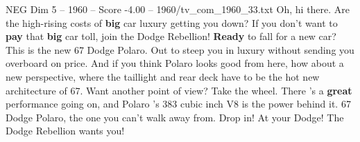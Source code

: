 \begin{textsample}{NEG Dim 5 – 1960 – Score -4.00 – 1960/tv\_com\_1960\_33.txt}  \label{ex:f5_neg_004}
Oh, hi there.
Are the high-rising costs of \textbf{big} car luxury getting you down?
If you don't want to \textbf{pay} that \textbf{big} car toll, join the Dodge Rebellion! \textbf{Ready} to fall for a new car?
This is the new 67 Dodge Polaro.
Out to steep you in luxury without sending you overboard on price.
And if you think Polaro looks good from here, how about a new perspective, where the taillight and rear deck have to be the hot new architecture of 67.
Want another point of view?
Take the wheel.
There 's a \textbf{great} performance going on, and Polaro 's 383 cubic inch V8 is the power behind it. 67 Dodge Polaro, the one you can't walk away from.
Drop in!
At your Dodge!
The Dodge Rebellion wants you!

\end{textsample}

